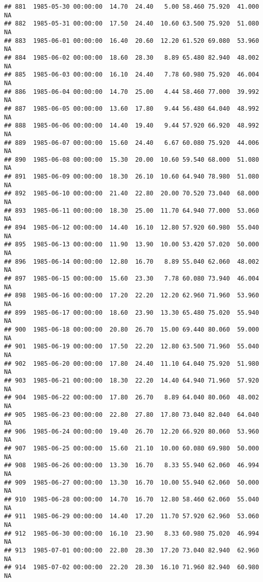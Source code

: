 \documentclass{article}\usepackage{graphicx, color}
\makeatletter
\newenvironment{kframe}{%
 \def\at@end@of@kframe{}%
 \ifinner\ifhmode%
  \def\at@end@of@kframe{\end{minipage}}%
  \begin{minipage}{\columnwidth}%
 \fi\fi%
 \def\FrameCommand##1{\hskip\@totalleftmargin \hskip-\fboxsep
 \colorbox{shadecolor}{##1}\hskip-\fboxsep
     \hskip-\linewidth \hskip-\@totalleftmargin \hskip\columnwidth}%
 \MakeFramed {\advance\hsize-\width
   \@totalleftmargin\z@ \linewidth\hsize
   \@setminipage}}%
 {\par\unskip\endMakeFramed%
 \at@end@of@kframe}
\newenvironment{knitrout}{}{} %
\makeatother
\begin{document}
\begin{knitrout}
\begin{kframe}
\begin{verbatim}
## 881  1985-05-30 00:00:00  14.70  24.40   5.00 58.460 75.920  41.000     NA
## 882  1985-05-31 00:00:00  17.50  24.40  10.60 63.500 75.920  51.080     NA
## 883  1985-06-01 00:00:00  16.40  20.60  12.20 61.520 69.080  53.960     NA
## 884  1985-06-02 00:00:00  18.60  28.30   8.89 65.480 82.940  48.002     NA
## 885  1985-06-03 00:00:00  16.10  24.40   7.78 60.980 75.920  46.004     NA
## 886  1985-06-04 00:00:00  14.70  25.00   4.44 58.460 77.000  39.992     NA
## 887  1985-06-05 00:00:00  13.60  17.80   9.44 56.480 64.040  48.992     NA
## 888  1985-06-06 00:00:00  14.40  19.40   9.44 57.920 66.920  48.992     NA
## 889  1985-06-07 00:00:00  15.60  24.40   6.67 60.080 75.920  44.006     NA
## 890  1985-06-08 00:00:00  15.30  20.00  10.60 59.540 68.000  51.080     NA
## 891  1985-06-09 00:00:00  18.30  26.10  10.60 64.940 78.980  51.080     NA
## 892  1985-06-10 00:00:00  21.40  22.80  20.00 70.520 73.040  68.000     NA
## 893  1985-06-11 00:00:00  18.30  25.00  11.70 64.940 77.000  53.060     NA
## 894  1985-06-12 00:00:00  14.40  16.10  12.80 57.920 60.980  55.040     NA
## 895  1985-06-13 00:00:00  11.90  13.90  10.00 53.420 57.020  50.000     NA
## 896  1985-06-14 00:00:00  12.80  16.70   8.89 55.040 62.060  48.002     NA
## 897  1985-06-15 00:00:00  15.60  23.30   7.78 60.080 73.940  46.004     NA
## 898  1985-06-16 00:00:00  17.20  22.20  12.20 62.960 71.960  53.960     NA
## 899  1985-06-17 00:00:00  18.60  23.90  13.30 65.480 75.020  55.940     NA
## 900  1985-06-18 00:00:00  20.80  26.70  15.00 69.440 80.060  59.000     NA
## 901  1985-06-19 00:00:00  17.50  22.20  12.80 63.500 71.960  55.040     NA
## 902  1985-06-20 00:00:00  17.80  24.40  11.10 64.040 75.920  51.980     NA
## 903  1985-06-21 00:00:00  18.30  22.20  14.40 64.940 71.960  57.920     NA
## 904  1985-06-22 00:00:00  17.80  26.70   8.89 64.040 80.060  48.002     NA
## 905  1985-06-23 00:00:00  22.80  27.80  17.80 73.040 82.040  64.040     NA
## 906  1985-06-24 00:00:00  19.40  26.70  12.20 66.920 80.060  53.960     NA
## 907  1985-06-25 00:00:00  15.60  21.10  10.00 60.080 69.980  50.000     NA
## 908  1985-06-26 00:00:00  13.30  16.70   8.33 55.940 62.060  46.994     NA
## 909  1985-06-27 00:00:00  13.30  16.70  10.00 55.940 62.060  50.000     NA
## 910  1985-06-28 00:00:00  14.70  16.70  12.80 58.460 62.060  55.040     NA
## 911  1985-06-29 00:00:00  14.40  17.20  11.70 57.920 62.960  53.060     NA
## 912  1985-06-30 00:00:00  16.10  23.90   8.33 60.980 75.020  46.994     NA
## 913  1985-07-01 00:00:00  22.80  28.30  17.20 73.040 82.940  62.960     NA
## 914  1985-07-02 00:00:00  22.20  28.30  16.10 71.960 82.940  60.980     NA

\end{verbatim}
\end{kframe}
\end{knitrout}
\end{document}
